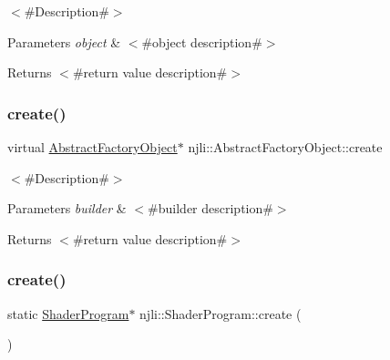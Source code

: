 $<$\#\+Description\#$>$


\begin{DoxyParams}{Parameters}
{\em object} & $<$\#object description\#$>$\\
\hline
\end{DoxyParams}
\begin{DoxyReturn}{Returns}
$<$\#return value description\#$>$ 
\end{DoxyReturn}
\mbox{\label{classnjli_1_1_shader_program_a83a8876ae63b92804004cf3febe76573}} 
\subsubsection{\texorpdfstring{create()}{create()}\hspace{0.1cm}{\footnotesize\ttfamily [1/3]}}
{\footnotesize\ttfamily virtual \mbox{\hyperlink{classnjli_1_1_abstract_factory_object}{Abstract\+Factory\+Object}}$\ast$ njli\+::\+Abstract\+Factory\+Object\+::create}

$<$\#\+Description\#$>$


\begin{DoxyParams}{Parameters}
{\em builder} & $<$\#builder description\#$>$\\
\hline
\end{DoxyParams}
\begin{DoxyReturn}{Returns}
$<$\#return value description\#$>$ 
\end{DoxyReturn}
\mbox{\label{classnjli_1_1_shader_program_a0d6c86874feb9ca5e1203afe5c30b216}} 
\subsubsection{\texorpdfstring{create()}{create()}\hspace{0.1cm}{\footnotesize\ttfamily [2/3]}}
{\footnotesize\ttfamily static \mbox{\hyperlink{classnjli_1_1_shader_program}{Shader\+Program}}$\ast$ njli\+::\+Shader\+Program\+::create (\begin{DoxyParamCaption}{ }\end{DoxyParamCaption})\hspace{0.3cm}{\ttfamily [static]}}

